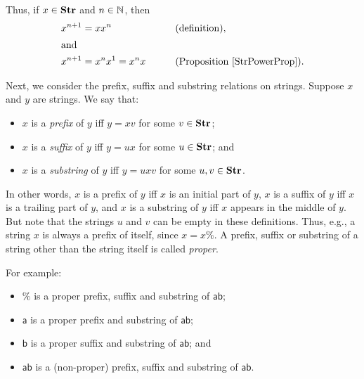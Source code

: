 Thus, if $x\in\mathbf{Str}$ and $n\in\mathbb{N}$, then
\begin{alignat*}{2}
x^{n+1} &= xx^n && \qquad{\textrm{(definition)}}, \\
\intertext{and}
x^{n+1} &= x^nx^1 = x^nx && \qquad{\textrm{(Proposition~\ref{StrPowerProp})}} .
\end{alignat*}

Next, we consider the prefix, suffix and substring relations on
strings.  Suppose $x$ and $y$ are strings.  We say that:
\begin{itemize}
\item $x$ is a \emph{prefix} of $y$ iff $y=xv$ for some $v\in\mathbf{Str}$;
%
%

\item $x$ is a \emph{suffix} of $y$ iff $y=ux$ for some $u\in\mathbf{Str}$; and
%
%

\item $x$ is a \emph{substring} of $y$ iff $y=uxv$ for some $u,v\in\mathbf{Str}$.
%
%
\end{itemize}
In other words, $x$ is a prefix of $y$ iff $x$ is an initial part of
$y$, $x$ is a suffix of $y$ iff $x$ is a trailing part of $y$, and $x$
is a substring of $y$ iff $x$ appears in the middle of $y$.  But note
that the strings $u$ and $v$ can be empty in these definitions.  Thus,
e.g., a string $x$ is always a prefix of itself, since $x=x\%$.  A
prefix, suffix or substring of a string other than the string itself
is called \emph{proper}.
%
%
%
%
%
%
%
%
%

For example:
\begin{itemize}
\item $\%$ is a proper prefix, suffix and substring of
$\mathsf{ab}$;

\item $\mathsf{a}$ is a proper prefix and substring of
$\mathsf{ab}$;

\item $\mathsf{b}$ is a proper suffix and substring of
$\mathsf{ab}$; and

\item $\mathsf{ab}$ is a (non-proper) prefix, suffix and
substring of $\mathsf{ab}$.
\end{itemize}

